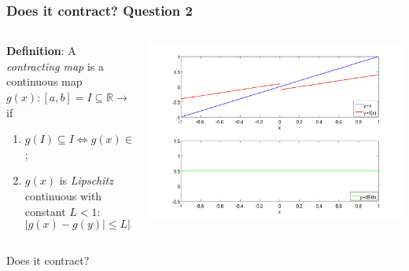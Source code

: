 \documentclass{beamer}
\begin{document}
\begin{frame}
\frametitle{Does it contract? Question 2}

\begin{columns}
    \begin{column}{0.45\textwidth}
  {\bf Definition}: A \emph{contracting map} is a continuous map
  $g(x) : [a, b] = I \subseteq \mathbb{R} \rightarrow \mathbb{R}$ if
\begin{enumerate}
  \item $g(I) \subseteq I \Leftrightarrow g(x) \in I \, \, \, \forall
    x \in I$;
  \item $g(x)$ is \emph{Lipschitz} continuous with constant $L < 1$:
    \begin{equation*}
      | g(x) - g(y) | \leq L | x - y | \, \, \, \forall x, y \in I.
    \end{equation*}
  \end{enumerate}
\end{column}
\begin{column}{0.55\textwidth}
  \begin{center}
   \includegraphics[width=\textwidth]{figures/cmap3}
  \end{center}
\end{column}
\end{columns}
\begin{overlayarea}{\textwidth}{0.1\textheight}
Does it contract?
\end{overlayarea}
\end{frame}
\end{document}
